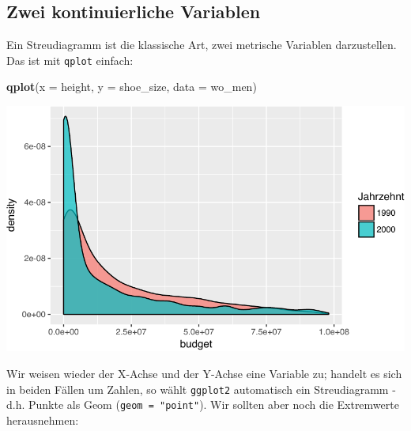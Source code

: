 \documentclass[12pt,ngerman,]{book}
\newenvironment{Shaded}{\begin{snugshade}}{\end{snugshade}}
\newcommand{\KeywordTok}[1]{\textcolor[rgb]{0.13,0.29,0.53}{\textbf{{#1}}}}
\newcommand{\DataTypeTok}[1]{\textcolor[rgb]{0.13,0.29,0.53}{{#1}}}
\newcommand{\DecValTok}[1]{\textcolor[rgb]{0.00,0.00,0.81}{{#1}}}
\newcommand{\StringTok}[1]{\textcolor[rgb]{0.31,0.60,0.02}{{#1}}}
\newcommand{\NormalTok}[1]{{#1}}
\renewenvironment{Shaded}{\begin{kframe}}{\end{kframe}}
\begin{document}
\subsection{Zwei kontinuierliche
Variablen}\label{zwei-kontinuierliche-variablen}

Ein Streudiagramm ist die klassische Art, zwei metrische Variablen
darzustellen. Das ist mit \texttt{qplot} einfach:

\begin{Shaded}
\begin{Highlighting}[]
\KeywordTok{qplot}\NormalTok{(}\DataTypeTok{x =} \NormalTok{height, }\DataTypeTok{y =} \NormalTok{shoe_size, }\DataTypeTok{data =} \NormalTok{wo_men)}
\end{Highlighting}
\end{Shaded}

\begin{center}\includegraphics[width=0.7\linewidth]{050_Daten_visualisieren_files/figure-latex/unnamed-chunk-12-1} \end{center}

Wir weisen wieder der X-Achse und der Y-Achse eine Variable zu; handelt
es sich in beiden Fällen um Zahlen, so wählt \texttt{ggplot2}
automatisch ein Streudiagramm - d.h. Punkte als Geom
(\texttt{geom\ =\ "point"}). Wir sollten aber noch die Extremwerte
herausnehmen:

\begin{Shaded}
\end{Shaded}
\end{document}
